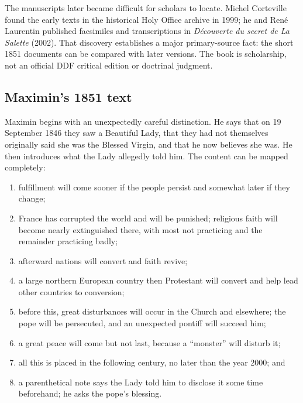 The manuscripts later became difficult for scholars to locate. Michel Corteville found the early texts in the historical Holy Office archive in 1999; he and René Laurentin published facsimiles and transcriptions in \emph{Découverte du secret de La Salette} (2002). That discovery establishes a major primary-source fact: the short 1851 documents can be compared with later versions. The book is scholarship, not an official DDF critical edition or doctrinal judgment.


\subsection{Maximin's 1851 text}

Maximin begins with an unexpectedly careful distinction. He says that on 19 September 1846 they saw a Beautiful Lady, that they had not themselves originally said she was the Blessed Virgin, and that he now believes she was. He then introduces what the Lady allegedly told him. The content can be mapped completely:

\begin{enumerate}
  \item fulfillment will come sooner if the people persist and somewhat later if they change;
  \item France has corrupted the world and will be punished; religious faith will become nearly extinguished there, with most not practicing and the remainder practicing badly;
  \item afterward nations will convert and faith revive;
  \item a large northern European country then Protestant will convert and help lead other countries to conversion;
  \item before this, great disturbances will occur in the Church and elsewhere; the pope will be persecuted, and an unexpected pontiff will succeed him;
  \item a great peace will come but not last, because a ``monster'' will disturb it;
  \item all this is placed in the following century, no later than the year 2000; and
  \item a parenthetical note says the Lady told him to disclose it some time beforehand; he asks the pope's blessing.
\end{enumerate}


